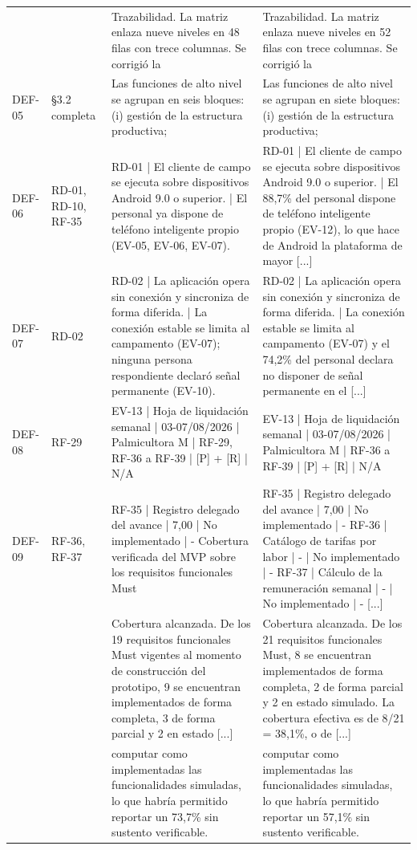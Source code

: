 \documentclass[11pt,letterpaper]{article}
\begin{document}
{\begin{longtable}{p{1.35cm} p{2.1cm} p{5.4cm} p{5.4cm}}
 &  & Trazabilidad. La matriz enlaza nueve niveles en 48 filas con trece columnas. Se corrigió la & Trazabilidad. La matriz enlaza nueve niveles en 52 filas con trece columnas. Se corrigió la\\
DEF-05 & \S 3.2 completa & Las funciones de alto nivel se agrupan en seis bloques: (i) gestión de la estructura productiva; & Las funciones de alto nivel se agrupan en siete bloques: (i) gestión de la estructura productiva;\\
DEF-06 & RD-01, RD-10, RF-35 & RD-01 | El cliente de campo se ejecuta sobre dispositivos Android 9.0 o superior. | El personal ya dispone de teléfono inteligente propio (EV-05, EV-06, EV-07). & RD-01 | El cliente de campo se ejecuta sobre dispositivos Android 9.0 o superior. | El 88,7\% del personal dispone de teléfono inteligente propio (EV-12), lo que hace de Android la plataforma de mayor [...]\\
DEF-07 & RD-02 & RD-02 | La aplicación opera sin conexión y sincroniza de forma diferida. | La conexión estable se limita al campamento (EV-07); ninguna persona respondiente declaró señal permanente (EV-10). & RD-02 | La aplicación opera sin conexión y sincroniza de forma diferida. | La conexión estable se limita al campamento (EV-07) y el 74,2\% del personal declara no disponer de señal permanente en el [...]\\
DEF-08 & RF-29 & EV-13 | Hoja de liquidación semanal | 03-07/08/2026 | Palmicultora M | RF-29, RF-36 a RF-39 | [P] + [R] | N/A & EV-13 | Hoja de liquidación semanal | 03-07/08/2026 | Palmicultora M | RF-36 a RF-39 | [P] + [R] | N/A\\
DEF-09 & RF-36, RF-37 & RF-35 | Registro delegado del avance | 7,00 | No implementado | - Cobertura verificada del MVP sobre los requisitos funcionales Must & RF-35 | Registro delegado del avance | 7,00 | No implementado | - RF-36 | Catálogo de tarifas por labor | - | No implementado | - RF-37 | Cálculo de la remuneración semanal | - | No implementado | - [...]\\
 &  & Cobertura alcanzada. De los 19 requisitos funcionales Must vigentes al momento de construcción del prototipo, 9 se encuentran implementados de forma completa, 3 de forma parcial y 2 en estado [...] & Cobertura alcanzada. De los 21 requisitos funcionales Must, 8 se encuentran implementados de forma completa, 2 de forma parcial y 2 en estado simulado. La cobertura efectiva es de 8/21 = 38,1\%, o de [...]\\
 &  & computar como implementadas las funcionalidades simuladas, lo que habría permitido reportar un 73,7\% sin sustento verificable. & computar como implementadas las funcionalidades simuladas, lo que habría permitido reportar un 57,1\% sin sustento verificable.\\

\end{longtable}}
\end{document}
